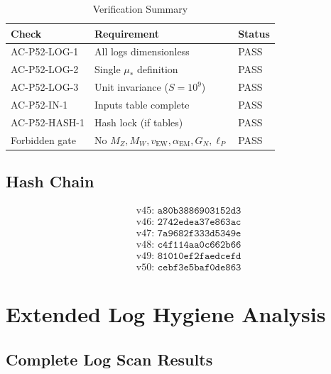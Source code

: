 \documentclass[11pt,a4paper]{article}
\theoremstyle{definition}
\begin{document}
\begin{table}[h]
\centering
\caption{Verification Summary}
\label{tab:verification_summary}
\begin{tabular}{@{}lll@{}}
\toprule
\textbf{Check} & \textbf{Requirement} & \textbf{Status} \\
\midrule
AC-P52-LOG-1 & All logs dimensionless & PASS \\
AC-P52-LOG-2 & Single $\mu_*$ definition & PASS \\
AC-P52-LOG-3 & Unit invariance ($S = 10^9$) & PASS \\
AC-P52-IN-1 & Inputs table complete & PASS \\
AC-P52-HASH-1 & Hash lock (if tables) & PASS \\
Forbidden gate & No $M_Z, M_W, v_{\text{EW}}, \alpha_{\text{EM}}, G_N, \ell_P$ & PASS \\
\bottomrule
\end{tabular}
\end{table}

\subsection{Hash Chain}
\label{subsec:hash_chain}

\begin{align}
\label{eq:hash_v45}
&\text{v45: } \texttt{a80b3886903152d3} \\
\label{eq:hash_v46}
&\text{v46: } \texttt{2742edea37e863ac} \\
\label{eq:hash_v47}
&\text{v47: } \texttt{7a9682f333d5349e} \\
\label{eq:hash_v48}
&\text{v48: } \texttt{c4f114aa0c662b66} \\
\label{eq:hash_v49}
&\text{v49: } \texttt{81010ef2faedcefd} \\
\label{eq:hash_v50}
&\text{v50: } \texttt{cebf3e5baf0de863}
\end{align}

\appendix
\section{Extended Log Hygiene Analysis}
\label{app:log_analysis}

\subsection{Complete Log Scan Results}
\label{subsec:log_scan}
\end{document}
